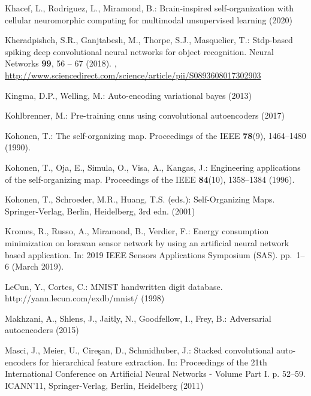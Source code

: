 \documentclass[runningheads]{llncs}
\begin{document}
\begin{thebibliography}{10}
Khacef, L., Rodriguez, L., Miramond, B.: Brain-inspired self-organization with
  cellular neuromorphic computing for multimodal unsupervised learning (2020)

Kheradpisheh, S.R., Ganjtabesh, M., Thorpe, S.J., Masquelier, T.: Stdp-based
  spiking deep convolutional neural networks for object recognition. Neural
  Networks  \textbf{99},  56 -- 67 (2018).
  ,
  \url{http://www.sciencedirect.com/science/article/pii/S0893608017302903}

Kingma, D.P., Welling, M.: Auto-encoding variational bayes (2013)

Kohlbrenner, M.: Pre-training cnns using convolutional autoencoders (2017)

Kohonen, T.: The self-organizing map. Proceedings of the IEEE  \textbf{78}(9),
  1464--1480 (1990). 

Kohonen, T., Oja, E., Simula, O., Visa, A., Kangas, J.: Engineering
  applications of the self-organizing map. Proceedings of the IEEE
  \textbf{84}(10),  1358--1384 (1996). 

Kohonen, T., Schroeder, M.R., Huang, T.S. (eds.): Self-Organizing Maps.
  Springer-Verlag, Berlin, Heidelberg, 3rd edn. (2001)

{Kromes}, R., {Russo}, A., {Miramond}, B., {Verdier}, F.: Energy consumption
  minimization on lorawan sensor network by using an artificial neural network
  based application. In: 2019 IEEE Sensors Applications Symposium (SAS).
  pp.~1--6 (March 2019). 

LeCun, Y., Cortes, C.: {MNIST} handwritten digit database.
  http://yann.lecun.com/exdb/mnist/ (1998)

Makhzani, A., Shlens, J., Jaitly, N., Goodfellow, I., Frey, B.: Adversarial
  autoencoders (2015)

Masci, J., Meier, U., Cire\c{s}an, D., Schmidhuber, J.: Stacked convolutional
  auto-encoders for hierarchical feature extraction. In: Proceedings of the
  21th International Conference on Artificial Neural Networks - Volume Part I.
  p. 52–59. ICANN’11, Springer-Verlag, Berlin, Heidelberg (2011)


\end{thebibliography}
\end{document}
